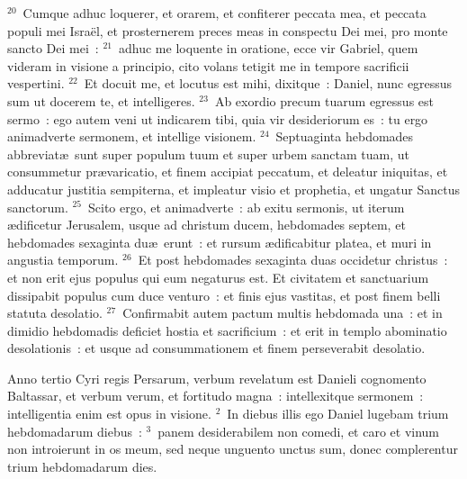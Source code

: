 ${}^{20}$~Cumque adhuc loquerer, et orarem, et confiterer peccata mea, et peccata populi mei Isra\"el, et prosternerem preces meas in conspectu Dei mei, pro monte sancto Dei mei~:
${}^{21}$~adhuc me loquente in oratione, ecce vir Gabriel, quem videram in visione a principio, cito volans tetigit me in tempore sacrificii vespertini.
${}^{22}$~Et docuit me, et locutus est mihi, dixitque~: Daniel, nunc egressus sum ut docerem te, et intelligeres.
${}^{23}$~Ab exordio precum tuarum egressus est sermo~: ego autem veni ut indicarem tibi, quia vir desideriorum es~: tu ergo animadverte sermonem, et intellige visionem.
${}^{24}$~Septuaginta hebdomades abbreviat\ae\ sunt super populum tuum et super urbem sanctam tuam, ut consummetur pr\ae varicatio, et finem accipiat peccatum, et deleatur iniquitas, et adducatur justitia sempiterna, et impleatur visio et prophetia, et ungatur Sanctus sanctorum.
${}^{25}$~Scito ergo, et animadverte~: ab exitu sermonis, ut iterum \ae dificetur Jerusalem, usque ad christum ducem, hebdomades septem, et hebdomades sexaginta du\ae\ erunt~: et rursum \ae dificabitur platea, et muri in angustia temporum.
${}^{26}$~Et post hebdomades sexaginta duas occidetur christus~: et non erit ejus populus qui eum negaturus est. Et civitatem et sanctuarium dissipabit populus cum duce venturo~: et finis ejus vastitas, et post finem belli statuta desolatio.
${}^{27}$~Confirmabit autem pactum multis hebdomada una~: et in dimidio hebdomadis deficiet hostia et sacrificium~: et erit in templo abominatio desolationis~: et usque ad consummationem et finem perseverabit desolatio.

\lettrine[lines=10,image=true,loversize=0.05,lraise=-0.03]{A}{}nno tertio Cyri regis Persarum, verbum revelatum est Danieli cognomento Baltassar, et verbum verum, et fortitudo magna~: intellexitque sermonem~: intelligentia enim est opus in visione.
${}^{2}$~In diebus illis ego Daniel lugebam trium hebdomadarum diebus~:
${}^{3}$~panem desiderabilem non comedi, et caro et vinum non introierunt in os meum, sed neque unguento unctus sum, donec complerentur trium hebdomadarum dies.


